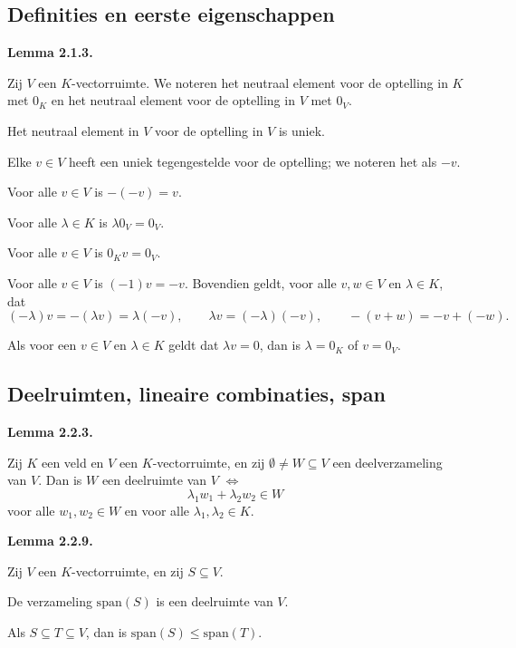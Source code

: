 \documentclass[10pt,a4paper]{article}
\newenvironment{res}[2]{%
  \par\noindent\textbf{#1 #2.}%
}{%
  \par\vspace{2pt}\normalfont
}
\begin{document}
\subsection{Definities en eerste eigenschappen}
\begin{res}{Lemma}{2.1.3}
Zij $V$ een $K$-vectorruimte. We noteren het neutraal element voor de optelling in $K$ met $0_K$ en het neutraal element voor de optelling in $V$ met $0_V$.
\begin{myenum}
\item Het neutraal element in $V$ voor de optelling in $V$ is uniek.
\item Elke $v\in V$ heeft een uniek tegengestelde voor de optelling; we noteren het als $-v$.
\item Voor alle $v\in V$ is $-(-v)=v$.
\item Voor alle $\lambda\in K$ is $\lambda 0_V=0_V$.
\item Voor alle $v\in V$ is $0_K v=0_V$.
\item Voor alle $v\in V$ is $(-1)v=-v$. Bovendien geldt, voor alle $v,w\in V$ en $\lambda\in K$, dat
\[
(-\lambda)v=-(\lambda v)=\lambda(-v),\qquad \lambda v=(-\lambda)(-v),\qquad -(v+w)=-v+(-w).
\]
\item Als voor een $v\in V$ en $\lambda\in K$ geldt dat $\lambda v=0$, dan is $\lambda=0_K$ of $v=0_V$.
\end{myenum}
\end{res}

\subsection{Deelruimten, lineaire combinaties, span}
\begin{res}{Lemma}{2.2.3}
Zij $K$ een veld en $V$ een $K$-vectorruimte, en zij $\emptyset\ne W\subseteq V$ een deelverzameling van $V$. Dan is $W$ een deelruimte van $V$ \(\iff\)
\[
\lambda_1w_1+\lambda_2w_2\in W
\]
voor alle $w_1,w_2\in W$ en voor alle $\lambda_1,\lambda_2\in K$.
\end{res}

\begin{res}{Lemma}{2.2.9}
Zij $V$ een $K$-vectorruimte, en zij $S\subseteq V$.
\begin{myenum}
\item De verzameling $\mathrm{span}(S)$ is een deelruimte van $V$.
\item Als $S\subseteq T\subseteq V$, dan is $\mathrm{span}(S)\le\mathrm{span}(T)$.
\end{myenum}
\end{res}
\end{document}
